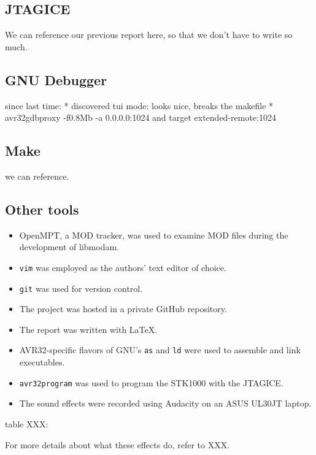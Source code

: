 
\subsection{JTAGICE}
We can reference our previous report here, so that we don't have to write so much.

\subsection{GNU Debugger}
since last time:
* discovered tui mode: looks nice, breaks the makefile
* avr32gdbproxy -f0.8Mb -a 0.0.0.0:1024 and target extended-remote:1024

\subsection{Make}
we can reference.

\subsection{Other tools}

\begin{itemize}
\item OpenMPT, a MOD tracker, was used to examine MOD files during the development of libmodam.
\item \texttt{vim} was employed as the authors' text editor of choice.
\item \texttt{git} was used for version control.
\item The project was hosted in a private GitHub repository.
\item The report was written with \LaTeX.
\item AVR32-specific flavors of GNU's \texttt{as} and \texttt{ld} were used to assemble and link executables.
\item \texttt{avr32program} was used to program the STK1000 with the JTAGICE.
\item The sound effects were recorded using Audacity on an ASUS UL30JT laptop.
\end{itemize}

table XXX:



For more details about what these effects do, refer to XXX.